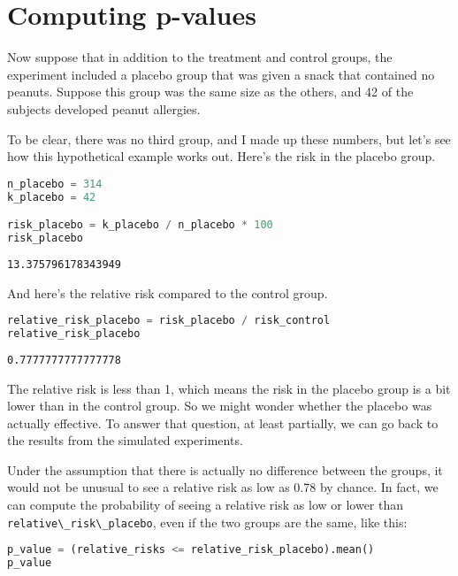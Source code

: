 \section{Computing p-values}\label{computing-p-values}

Now suppose that in addition to the treatment and control groups, the
experiment included a placebo group that was given a snack that
contained no peanuts. Suppose this group was the same size as the
others, and 42 of the subjects developed peanut allergies.

To be clear, there was no third group, and I made up these numbers, but
let's see how this hypothetical example works out. Here's the risk in
the placebo group.

\begin{lstlisting}[language=Python,style=source]
n_placebo = 314
k_placebo = 42

risk_placebo = k_placebo / n_placebo * 100
risk_placebo
\end{lstlisting}

\begin{lstlisting}[style=output]
13.375796178343949
\end{lstlisting}

And here's the relative risk compared to the control group.

\begin{lstlisting}[language=Python,style=source]
relative_risk_placebo = risk_placebo / risk_control
relative_risk_placebo
\end{lstlisting}

\begin{lstlisting}[style=output]
0.7777777777777778
\end{lstlisting}

The relative risk is less than 1, which means the risk in the placebo
group is a bit lower than in the control group. So we might wonder
whether the placebo was actually effective. To answer that question, at
least partially, we can go back to the results from the simulated
experiments.

Under the assumption that there is actually no difference between the
groups, it would not be unusual to see a relative risk as low as 0.78 by
chance. In fact, we can compute the probability of seeing a relative
risk as low or lower than
\passthrough{\lstinline!relative\_risk\_placebo!}, even if the two
groups are the same, like this:

\begin{lstlisting}[language=Python,style=source]
p_value = (relative_risks <= relative_risk_placebo).mean()
p_value
\end{lstlisting}

